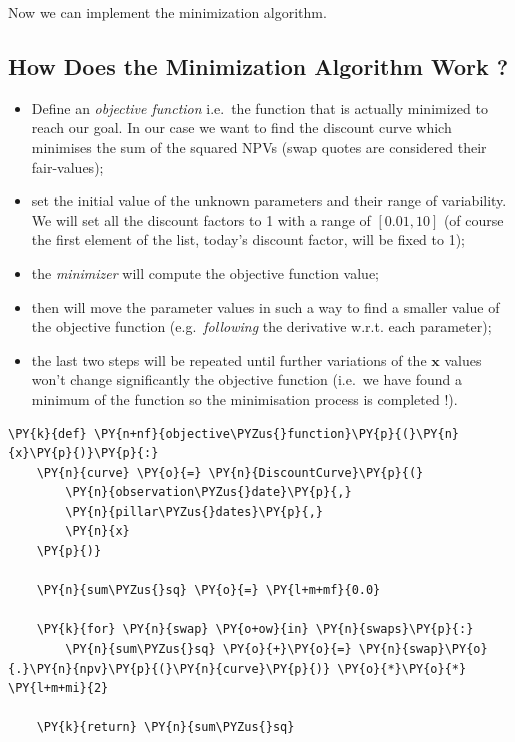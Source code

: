 Now we can implement the minimization algorithm.
            
\subsection{How Does the Minimization Algorithm Work ?}\label{how-does-the-minimization-algorithm-work}

\begin{itemize}
\item
  Define an \emph{objective function} i.e.~the function that is actually minimized to reach our goal. In our case we want to find the discount curve which minimises the sum of the squared NPVs (swap quotes are considered their fair-values);
\item
  set the initial value of the unknown parameters and their range of variability. We will set all the discount factors to 1 with a range of \([0.01, 10]\) (of course the first element of the list, today's discount factor, will be fixed to 1);
\item
  the \emph{minimizer} will compute the objective function value;
\item
  then will move the parameter values in such a way to find a smaller value of the objective function (e.g.~\emph{following} the derivative w.r.t. each parameter);
\item
  the last two steps will be repeated until further variations of the $\mathbf{x}$ values won't change significantly the objective function (i.e.~we have found a minimum of the function so the minimisation process is completed !).
\end{itemize}

\begin{tcolorbox}[breakable, size=fbox, boxrule=1pt, pad at break*=1mm,colback=cellbackground, colframe=cellborder]
\begin{Verbatim}[commandchars=\\\{\}]
\PY{k}{def} \PY{n+nf}{objective\PYZus{}function}\PY{p}{(}\PY{n}{x}\PY{p}{)}\PY{p}{:}             
    \PY{n}{curve} \PY{o}{=} \PY{n}{DiscountCurve}\PY{p}{(}       
        \PY{n}{observation\PYZus{}date}\PY{p}{,}
        \PY{n}{pillar\PYZus{}dates}\PY{p}{,}
        \PY{n}{x}
    \PY{p}{)}
    
    \PY{n}{sum\PYZus{}sq} \PY{o}{=} \PY{l+m+mf}{0.0}
    
    \PY{k}{for} \PY{n}{swap} \PY{o+ow}{in} \PY{n}{swaps}\PY{p}{:}
        \PY{n}{sum\PYZus{}sq} \PY{o}{+}\PY{o}{=} \PY{n}{swap}\PY{o}{.}\PY{n}{npv}\PY{p}{(}\PY{n}{curve}\PY{p}{)} \PY{o}{*}\PY{o}{*} \PY{l+m+mi}{2}
        
    \PY{k}{return} \PY{n}{sum\PYZus{}sq}
\end{Verbatim}
\end{tcolorbox}

